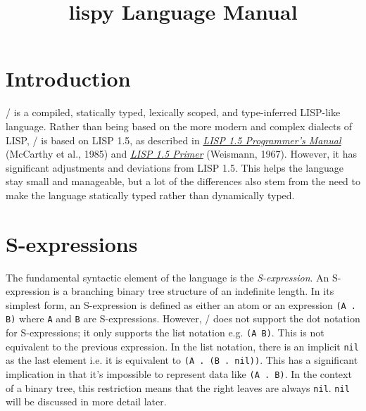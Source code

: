 \documentclass[a4paper, 12pt]{article}
\title{lispy Language Manual}
\begin{document}
\maketitle
{
\hypersetup{linkcolor=black}
\tableofcontents
}

\newpage
\section{Introduction}
\lispy/ is a compiled, statically typed, lexically scoped, and type-inferred LISP-like language. Rather than being based on the more modern and complex dialects of LISP, \lispy/ is based on LISP 1.5, as described in \href{https://www.lispmachine.net/books/LISP_1.5_Programmers_Manual.pdf}{\textit{LISP 1.5 Programmer's Manual}} (McCarthy et al., 1985) and \href{http://www.softwarepreservation.org/projects/LISP/book/Weismann_LISP1.5_Primer_1967.pdf}{\textit{LISP 1.5 Primer}} (Weismann, 1967). However, it has significant adjustments and deviations from LISP 1.5. This helps the language stay small and manageable, but a lot of the differences also stem from the need to make the language statically typed rather than dynamically typed.

\section{S-expressions}
The fundamental syntactic element of the language is the \textit{S-expression}. An S-expression is a branching binary tree structure of an indefinite length. In its simplest form, an S-expression is defined as either an atom or an expression \texttt{(A . B)} where \texttt{A} and \texttt{B} are S-expressions. However, \lispy/ does not support the dot notation for S-expressions; it only supports the list notation e.g. \texttt{(A B)}. This is not equivalent to the previous expression. In the list notation, there is an implicit \texttt{nil} as the last element i.e. it is equivalent to \texttt{(A . (B . nil))}. This has a significant implication in that it's impossible to represent data like \texttt{(A . B)}. In the context of a binary tree, this restriction means that the right leaves are always \texttt{nil}. \texttt{nil} will be discussed in more detail later.
\end{document}
